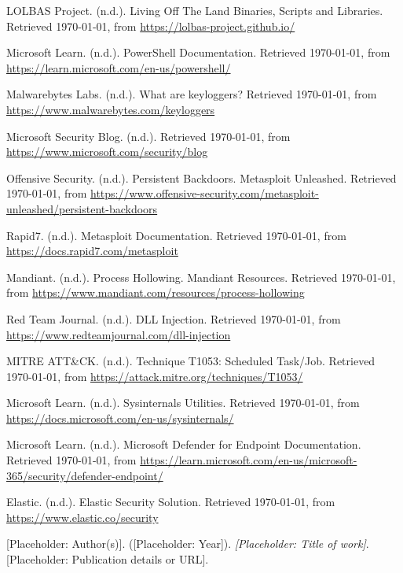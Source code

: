 \documentclass{ULBreport}
\begin{document}
\begin{thebibliography}{99}
	
	 LOLBAS Project. (n.d.). Living Off The Land Binaries, Scripts and Libraries. Retrieved \today, from \url{https://lolbas-project.github.io/}
	
	 Microsoft Learn. (n.d.). PowerShell Documentation. Retrieved \today, from \url{https://learn.microsoft.com/en-us/powershell/}
	
	 Malwarebytes Labs. (n.d.). What are keyloggers? Retrieved \today, from \url{https://www.malwarebytes.com/keyloggers} %
	
	 Microsoft Security Blog. (n.d.). Retrieved \today, from \url{https://www.microsoft.com/security/blog}
	
	 Offensive Security. (n.d.). Persistent Backdoors. Metasploit Unleashed. Retrieved \today, from \url{https://www.offensive-security.com/metasploit-unleashed/persistent-backdoors}
	
	 Rapid7. (n.d.). Metasploit Documentation. Retrieved \today, from \url{https://docs.rapid7.com/metasploit}
	
	 Mandiant. (n.d.). Process Hollowing. Mandiant Resources. Retrieved \today, from \url{https://www.mandiant.com/resources/process-hollowing} %
	
	 Red Team Journal. (n.d.). DLL Injection. Retrieved \today, from \url{https://www.redteamjournal.com/dll-injection} %
	
	 MITRE ATT\&CK. (n.d.). Technique T1053: Scheduled Task/Job. Retrieved \today, from \url{https://attack.mitre.org/techniques/T1053/} %
	
	 Microsoft Learn. (n.d.). Sysinternals Utilities. Retrieved \today, from \url{https://docs.microsoft.com/en-us/sysinternals/}
	
	 Microsoft Learn. (n.d.). Microsoft Defender for Endpoint Documentation. Retrieved \today, from \url{https://learn.microsoft.com/en-us/microsoft-365/security/defender-endpoint/}
	
	 Elastic. (n.d.). Elastic Security Solution. Retrieved \today, from \url{https://www.elastic.co/security}
	
	 [Placeholder: Author(s)]. ([Placeholder: Year]). \textit{[Placeholder: Title of work]}. [Placeholder: Publication details or URL].
	
\end{thebibliography}

\end{document}
